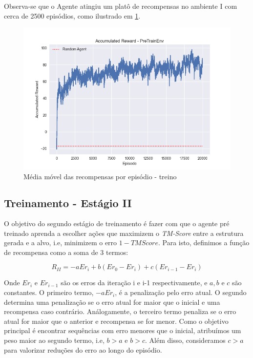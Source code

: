 Observa-se que o Agente atingiu um platô de recompensas no ambiente I com cerca de 2500 episódios, como ilustrado em 
\ref{fig:rew_per_ep_pretrain}.

  \begin{figure}[H]
    \centering
    \includegraphics[width=.8\linewidth]{figuras/plot_pre_train_reward.jpg}    
    \caption{Média móvel das recompensas por episódio - treino}
    \label{fig:rew_per_ep_pretrain}
  \end{figure}


\subsection{Treinamento - Estágio II}
\label{subsection:stage2}
O objetivo do segundo estágio de treinamento é fazer com que o agente pré treinado aprenda a escolher ações que maximizem o \textit{TM-Score} entre a estrutura gerada e a alvo, 
i.e, minimizem o erro $1-TMScore$.
Para isto, definimos a função de recompensa como a soma de 3 termos: 

\begin{equation}
    R_{II} = -aEr_{i} + b(Er_{0} - Er_{i}) + c(Er_{i-1} - Er_{i})
\end{equation}

\noindent
Onde $Er_{i}$ e $Er_{i-1}$ são os erros da iteração i e i-1 respectivamente, e $a, b$ e $c$ são constantes. 
O primeiro termo, $-aEr_{i}$, é a penalização pelo erro atual.
O segundo determina uma penalização se o erro atual for maior que o inicial e uma recompensa caso contrário.
Análogamente, o terceiro termo penaliza se o erro atual for maior que o anterior e recompensa se for menor.
Como o objetivo principal é encontrar sequências com erro menores que o inicial, atribuímos um peso maior ao segundo termo, i.e, $b>a$ e $b>c$.
Além disso, consideramos $c>a$ para valorizar reduções do erro ao longo do episódio.  

